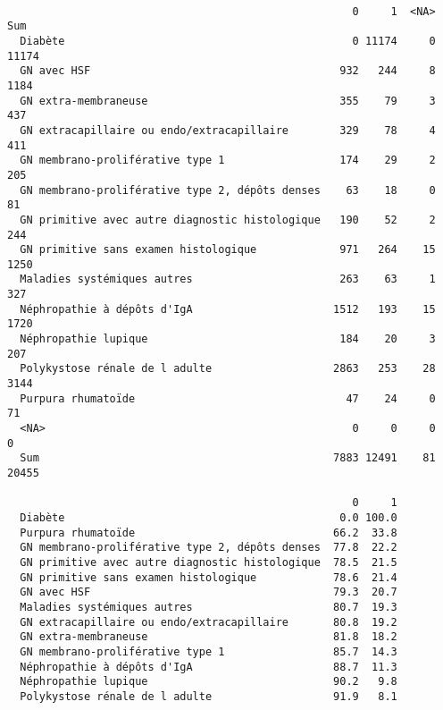 \documentclass[11pt,a4paper]{article}\usepackage[]{graphicx}\usepackage[]{color}
\makeatletter
\newenvironment{kframe}{%
 \def\at@end@of@kframe{}%
 \ifinner\ifhmode%
  \def\at@end@of@kframe{\end{minipage}}%
  \begin{minipage}{\columnwidth}%
 \fi\fi%
 \def\FrameCommand##1{\hskip\@totalleftmargin \hskip-\fboxsep
 \colorbox{shadecolor}{##1}\hskip-\fboxsep
     \hskip-\linewidth \hskip-\@totalleftmargin \hskip\columnwidth}%
 \MakeFramed {\advance\hsize-\width
   \@totalleftmargin\z@ \linewidth\hsize
   \@setminipage}}%
 {\par\unskip\endMakeFramed%
 \at@end@of@kframe}
\newenvironment{knitrout}{}{} %
\makeatother
\begin{document}
\begin{knitrout}
\color{fgcolor}\begin{kframe}
\begin{verbatim}
                                                 
                                                      0     1  <NA>   Sum
  Diabète                                             0 11174     0 11174
  GN avec HSF                                       932   244     8  1184
  GN extra-membraneuse                              355    79     3   437
  GN extracapillaire ou endo/extracapillaire        329    78     4   411
  GN membrano-proliférative type 1                  174    29     2   205
  GN membrano-proliférative type 2, dépôts denses    63    18     0    81
  GN primitive avec autre diagnostic histologique   190    52     2   244
  GN primitive sans examen histologique             971   264    15  1250
  Maladies systémiques autres                       263    63     1   327
  Néphropathie à dépôts d'IgA                      1512   193    15  1720
  Néphropathie lupique                              184    20     3   207
  Polykystose rénale de l adulte                   2863   253    28  3144
  Purpura rhumatoïde                                 47    24     0    71
  <NA>                                                0     0     0     0
  Sum                                              7883 12491    81 20455
                                                 
                                                      0     1
  Diabète                                           0.0 100.0
  Purpura rhumatoïde                               66.2  33.8
  GN membrano-proliférative type 2, dépôts denses  77.8  22.2
  GN primitive avec autre diagnostic histologique  78.5  21.5
  GN primitive sans examen histologique            78.6  21.4
  GN avec HSF                                      79.3  20.7
  Maladies systémiques autres                      80.7  19.3
  GN extracapillaire ou endo/extracapillaire       80.8  19.2
  GN extra-membraneuse                             81.8  18.2
  GN membrano-proliférative type 1                 85.7  14.3
  Néphropathie à dépôts d'IgA                      88.7  11.3
  Néphropathie lupique                             90.2   9.8
  Polykystose rénale de l adulte                   91.9   8.1
\end{verbatim}
\end{kframe}
\end{knitrout}
\end{document}
